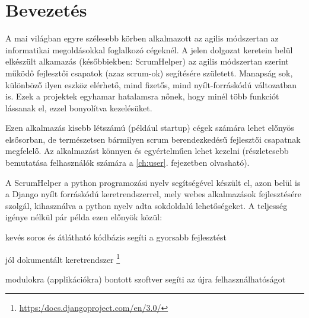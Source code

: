 \chapter{Bevezetés} %
\label{ch:intro}

A mai világban egyre szélesebb körben alkalmazott az agilis módszertan az informatikai megoldásokkal foglalkozó cégeknél. A jelen dolgozat keretein belül elkészült alkamazás (későbbiekben: ScrumHelper) az agilis módszertan szerint működő fejlesztői csapatok (azaz scrum-ok) segítésére született. Manapság sok, különböző ilyen eszköz elérhető, mind fizetős, mind nyílt-forráskódú változatban is. Ezek a projektek egyhamar hatalamsra nőnek, hogy minél több funkciót lássanak el, ezzel bonyolítva kezelésüket.

 Ezen alkalmazás kisebb létszámú (például startup) cégek számára lehet előnyös elsősorban, de természetsen bármilyen scrum berendezkedésű fejlesztői csapatnak megfelelő. Az alkalmazást könnyen és egyértelműen lehet kezelni (részletesebb bemutatása felhasználók számára a \ref{ch:user}. fejezetben olvasható). 

A ScrumHelper a python programozási nyelv segítségével készült el, azon belül is a Django nyílt forráskódú keretrendszerrel, mely webes alkalmazások fejlesztésére szolgál, kihasználva a python nyelv adta  sokdoldalú lehetőségeket. A teljesség igénye nélkül pár példa ezen előnyök közül: 
\begin{compactitem}
	\item kevés soros és átlátható  kódbázis segíti a gyorsabb fejlesztést
	\item jól dokumentált keretrendszer \footnote{\url{https:/docs.djangoproject.com/en/3.0/}}
	\item modulokra (applikációkra) bontott szoftver segíti az újra felhasználhatóságot
\end{compactitem}

